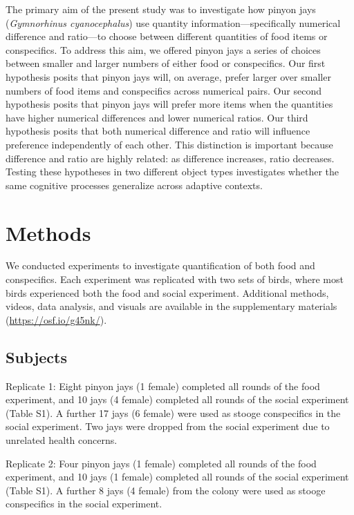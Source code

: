 \documentclass[
  ,pub,floatsintext]{apa6}
\begin{document}
The primary aim of the present study was to investigate how pinyon jays (\emph{Gymnorhinus cyanocephalus}) use quantity information---specifically numerical difference and ratio---to choose between different quantities of food items or conspecifics. To address this aim, we offered pinyon jays a series of choices between smaller and larger numbers of either food or conspecifics. Our first hypothesis posits that pinyon jays will, on average, prefer larger over smaller numbers of food items and conspecifics across numerical pairs. Our second hypothesis posits that pinyon jays will prefer more items when the quantities have higher numerical differences and lower numerical ratios. Our third hypothesis posits that both numerical difference and ratio will influence preference independently of each other. This distinction is important because difference and ratio are highly related: as difference increases, ratio decreases. Testing these hypotheses in two different object types investigates whether the same cognitive processes generalize across adaptive contexts.

\hypertarget{methods}{%
\section{Methods}\label{methods}}

We conducted experiments to investigate quantification of both food and conspecifics. Each experiment was replicated with two sets of birds, where most birds experienced both the food and social experiment. Additional methods, videos, data analysis, and visuals are available in the supplementary materials (\url{https://osf.io/g45nk/}).

\hypertarget{subjects}{%
\subsection{Subjects}\label{subjects}}

Replicate 1: Eight pinyon jays (1 female) completed all rounds of the food experiment, and 10 jays (4 female) completed all rounds of the social experiment (Table S1). A further 17 jays (6 female) were used as stooge conspecifics in the social experiment. Two jays were dropped from the social experiment due to unrelated health concerns.

Replicate 2: Four pinyon jays (1 female) completed all rounds of the food experiment, and 10 jays (1 female) completed all rounds of the social experiment (Table S1). A further 8 jays (4 female) from the colony were used as stooge conspecifics in the social experiment.
\end{document}

